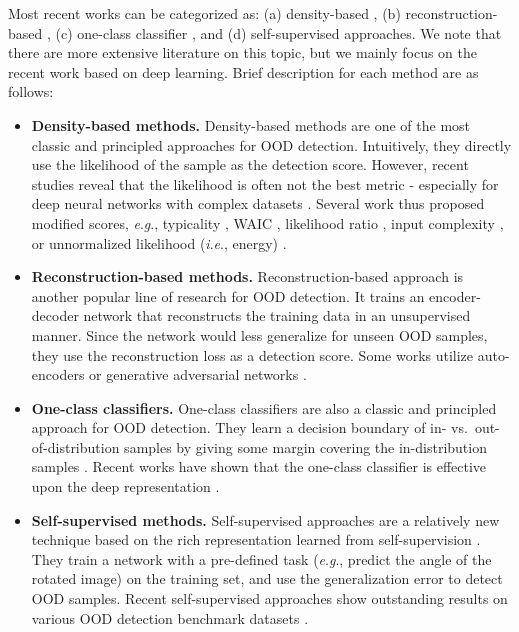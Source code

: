 \documentclass{article}
\newcommand{\ie}{\textit{i}.\textit{e}.}
\newcommand{\eg}{\textit{e}.\textit{g}.}
\begin{document}
Most recent works can be categorized as: (a) density-based \citep{zhai2016deep,nalisnick2019deep,choi2018waic,nalisnick2019detecting,du2019implicit,ren2019likelihood,serra2020input,grathwohl2020your}, (b) reconstruction-based \citep{schlegl2017unsupervised,zong2018deep,deecke2018anomaly,pidhorskyi2018generative,perera2019ocgan,choi2020novelty}, (c) one-class classifier \citep{scholkopf2000support,ruff2018deep,ruff2020deep}, and (d) self-supervised \citep{golan2018deep,hendrycks2019using_self,bergman2020classification} approaches. We note that there are more extensive literature on this topic, but we mainly focus on the recent work based on deep learning. Brief description for each method are as follows:
\begin{itemize}
    \item \textbf{Density-based methods.} Density-based methods are one of the most classic and principled approaches for OOD detection. Intuitively, they directly use the likelihood of the sample as the detection score. However, recent studies reveal that the likelihood is often not the best metric - especially for deep neural networks with complex datasets \citep{nalisnick2019deep}. Several work thus proposed modified scores, \eg, typicality \citep{nalisnick2019detecting}, WAIC \citep{choi2018waic}, likelihood ratio \citep{ren2019likelihood}, input complexity \citep{serra2020input}, or unnormalized likelihood (\ie, energy) \citep{du2019implicit,grathwohl2020your}.
\item \textbf{Reconstruction-based methods.} Reconstruction-based approach is another popular line of research for OOD detection. It trains an encoder-decoder network that reconstructs the training data in an unsupervised manner. Since the network would less generalize for unseen OOD samples, they use the reconstruction loss as a detection score. Some works utilize auto-encoders \citep{zong2018deep,pidhorskyi2018generative} or generative adversarial networks \citep{schlegl2017unsupervised,deecke2018anomaly,perera2019ocgan}.
\item \textbf{One-class classifiers.} One-class classifiers are also a classic and principled approach for OOD detection. They learn a decision boundary of in- vs.\ out-of-distribution samples by giving some margin covering the in-distribution samples \citep{scholkopf2000support}. Recent works have shown that the one-class classifier is effective upon the deep representation \citep{ruff2018deep}.
\item \textbf{Self-supervised methods.} Self-supervised approaches are a relatively new technique based on the rich representation learned from self-supervision \citep{gidaris2018unsupervised}. They train a network with a pre-defined task (\eg, predict the angle of the rotated image) on the training set, and use the generalization error to detect OOD samples. Recent self-supervised approaches show outstanding results on various OOD detection benchmark datasets \citep{golan2018deep,hendrycks2019using_self,bergman2020classification}.
\end{itemize}
\end{document}
